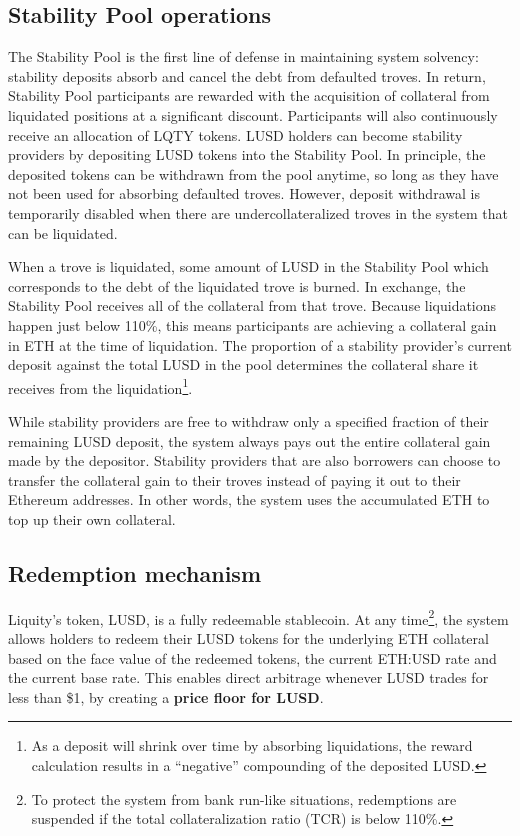 \documentclass{article}
\begin{document}
\subsection{Stability Pool operations}
The Stability Pool is the first line of defense in maintaining system solvency: stability deposits absorb and cancel the debt from defaulted troves. In return, Stability Pool participants are rewarded with the acquisition of collateral from liquidated positions at a significant discount. Participants will also continuously receive an allocation of LQTY tokens.
LUSD holders can become stability providers by depositing LUSD tokens into the Stability Pool. In principle, the deposited tokens can be withdrawn from the pool anytime, so long as they have not been used for absorbing defaulted troves. However, deposit withdrawal is temporarily disabled when there are undercollateralized troves in the system that can be liquidated.

When a trove is liquidated, some amount of LUSD in the Stability Pool which corresponds to the debt of the liquidated trove is burned. In exchange, the Stability Pool receives all of the collateral from that trove. Because liquidations happen just below 110\%, this means participants are achieving a collateral gain in ETH at the time of liquidation. The proportion of a stability provider’s current deposit against the total LUSD in the pool determines the collateral share it receives from the liquidation\footnote{As a deposit will shrink over time by absorbing liquidations, the reward calculation results in a “negative” compounding of the deposited LUSD.}. 

While stability providers are free to withdraw only a specified fraction of their remaining LUSD deposit, the system always pays out the entire collateral gain made by the depositor. Stability providers that are also borrowers can choose to transfer the collateral gain to their troves instead of paying it out to their Ethereum addresses. In other words, the system uses the accumulated ETH to top up their own collateral. 

\subsection{Redemption mechanism}
Liquity’s token, LUSD, is a fully redeemable stablecoin. At any time\footnote{To protect the system from bank run-like situations, redemptions are suspended if the total collateralization ratio (TCR) is below 110\%.}, the system allows holders to redeem their LUSD tokens for the underlying ETH collateral based on the face value of the redeemed tokens, the current ETH:USD rate and the current base rate. This enables direct arbitrage whenever LUSD trades for less than \$1, by creating a \textbf{price floor for LUSD}.\\
\end{document}
